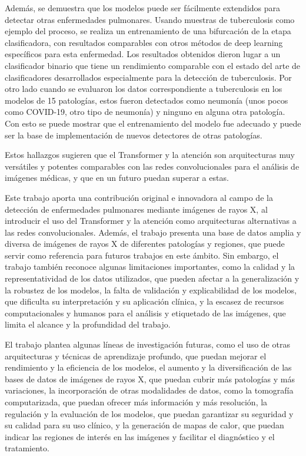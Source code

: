 Además, se demuestra que los modelos puede ser fácilmente extendidos para detectar otras enfermedades
pulmonares. Usando muestras de tuberculosis como ejemplo del proceso, se realiza un entrenamiento
de una bifurcación de la etapa clasificadora, con resultados comparables con otros métodos de deep learning
específicos para esta enfermedad. Los resultados obtenidos dieron lugar a un clasificador binario que tiene un
rendimiento comparable con el estado del arte de clasificadores desarrollados especialmente para la
detección de tuberculosis. Por otro lado cuando se evaluaron los datos correspondiente a tuberculosis
en los modelos de 15 patologías, estos fueron detectados como neumonía (unos pocos como COVID-19, otro
tipo de neumonía) y ninguno en alguna otra patología. Con esto se puede mostrar que el entrenamiento
del modelo fue adecuado y puede ser la base de implementación de nuevos detectores de otras patologías.

Estos hallazgos sugieren que el Transformer y la atención son
arquitecturas muy versátiles y potentes comparables con las redes convolucionales para el análisis
de imágenes médicas, y que en un futuro puedan superar a estas.

Este trabajo aporta una contribución original e innovadora al campo de la detección de enfermedades
pulmonares mediante imágenes de rayos X, al introducir el uso del Transformer y la atención como
arquitecturas alternativas a las redes convolucionales. Además, el trabajo presenta una base de
datos amplia y diversa de imágenes de rayos X de diferentes patologías y regiones, que puede servir
como referencia para futuros trabajos en este ámbito. Sin embargo, el trabajo también reconoce algunas
limitaciones importantes, como la calidad y la representatividad de los datos utilizados, que pueden
afectar a la generalización y la robustez de los modelos, la falta de validación y explicabilidad de
los modelos, que dificulta su interpretación y su aplicación clínica, y la escasez de recursos
computacionales y humanos para el análisis y etiquetado de las imágenes, que limita el alcance y la
profundidad del trabajo.


El trabajo plantea algunas líneas de investigación futuras, como el uso de otras arquitecturas y
técnicas de aprendizaje profundo, que puedan mejorar el rendimiento y la eficiencia de los modelos,
el aumento y la diversificación de las bases de datos de imágenes de rayos X, que puedan cubrir más
patologías y más variaciones, la incorporación de otras modalidades de datos, como la tomografía
computarizada, que puedan ofrecer más información y más resolución, la regulación y la evaluación de
los modelos, que puedan garantizar su seguridad y su calidad para su uso clínico, y la generación de
mapas de calor, que puedan indicar las regiones de interés en las imágenes y facilitar el diagnóstico
y el tratamiento.
